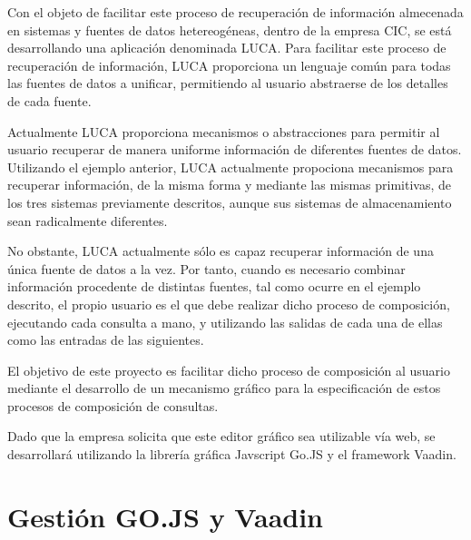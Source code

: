 \documentclass[a4paper,12pt]{article}
\newcounter{ns}
\begin{document}
	\vspace{5mm}
	
	
	 Con el objeto de facilitar este proceso de recuperación de información almecenada en sistemas y fuentes de datos hetereogéneas, dentro de la empresa	CIC, se está desarrollando una aplicación denominada LUCA. Para	facilitar este proceso de recuperación de información, LUCA proporciona un lenguaje común para todas las fuentes de datos a unificar, permitiendo al
	usuario abstraerse de los detalles de cada fuente.
	
	\vspace{5mm}
	
	 Actualmente LUCA proporciona mecanismos o abstracciones para permitir al	usuario recuperar de manera uniforme información de diferentes fuentes de datos.	Utilizando el ejemplo anterior, LUCA actualmente propociona mecanismos para
	recuperar información, de la misma forma y mediante las mismas primitivas, de los tres sistemas previamente descritos, aunque sus sistemas de almacenamiento sean radicalmente diferentes.
	
	\vspace{5mm}
	
	 No obstante, LUCA actualmente sólo es capaz recuperar información de una única fuente de datos a la vez. Por tanto, cuando es necesario combinar información procedente de distintas fuentes, tal como ocurre en el ejemplo descrito, el propio usuario es el que debe realizar dicho	proceso de composición, ejecutando cada consulta a mano, y utilizando las salidas de cada una de ellas como las entradas de las siguientes.
	 
	 \vspace{5mm}
	 
	 El objetivo de este proyecto es facilitar dicho proceso de composición al usuario mediante el desarrollo de un mecanismo gráfico para la especificación de estos procesos de composición de consultas.
	 
	 \vspace{5mm}
	 
	 Dado que la empresa solicita que este editor gráfico sea utilizable vía web, se desarrollará utilizando la librería gráfica Javscript Go.JS y el framework Vaadin.
	 
	  \afterpage{\null\newpage}
	 \newpage
	 
	 \section{Gestión GO.JS y Vaadin}
	 
\end{document}
